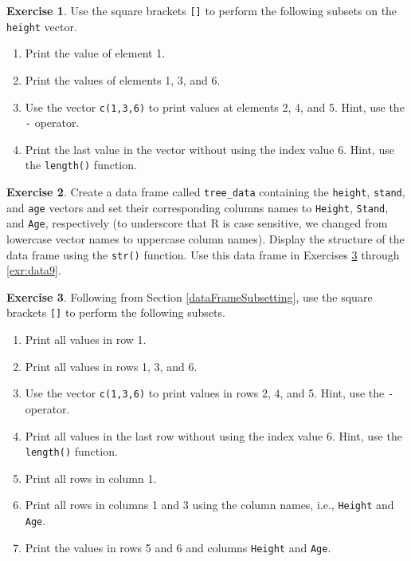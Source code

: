 \documentclass[
  11pt,
]{krantz}
\providecommand{\tightlist}{%
  \setlength{\itemsep}{0pt}\setlength{\parskip}{0pt}}
\theoremstyle{definition}
\theoremstyle{definition}
\theoremstyle{definition}
\newtheorem{exercise}{Exercise}[chapter]
\theoremstyle{definition}
\theoremstyle{remark}
\begin{document}
\begin{exercise}
\protect\hypertarget{exr:data3}{}\label{exr:data3}Use the square brackets \texttt{{[}{]}} to perform the following subsets on the \texttt{height} vector.
\end{exercise}

\begin{enumerate}
\def\labelenumi{\alph{enumi}.}
\tightlist
\item
  Print the value of element 1.
\item
  Print the values of elements 1, 3, and 6.
\item
  Use the vector \texttt{c(1,3,6)} to print values at elements 2, 4, and 5. Hint, use the \texttt{-} operator.
\item
  Print the last value in the vector without using the index value 6. Hint, use the \texttt{length()} function.
\end{enumerate}

\begin{exercise}
\protect\hypertarget{exr:data4}{}\label{exr:data4}Create a data frame called \texttt{tree\_data} containing the \texttt{height}, \texttt{stand}, and \texttt{age} vectors and set their corresponding columns names to \texttt{Height}, \texttt{Stand}, and \texttt{Age}, respectively (to underscore that R is case sensitive, we changed from lowercase vector names to uppercase column names). Display the structure of the data frame using the \texttt{str()} function. Use this data frame in Exercises \ref{exr:data5} through \ref{exr:data9}.
\end{exercise}

\begin{exercise}
\protect\hypertarget{exr:data5}{}\label{exr:data5}Following from Section \ref{dataFrameSubsetting}, use the square brackets \texttt{{[}{]}} to perform the following subsets.
\end{exercise}

\begin{enumerate}
\def\labelenumi{\alph{enumi}.}
\tightlist
\item
  Print all values in row 1.
\item
  Print all values in rows 1, 3, and 6.
\item
  Use the vector \texttt{c(1,3,6)} to print values in rows 2, 4, and 5. Hint, use the \texttt{-} operator.
\item
  Print all values in the last row without using the index value 6. Hint, use the \texttt{length()} function.
\item
  Print all rows in column 1.
\item
  Print all rows in columns 1 and 3 using the column names, i.e., \texttt{Height} and \texttt{Age}.
\item
  Print the values in rows 5 and 6 and columns \texttt{Height} and \texttt{Age}.
\end{enumerate}
\end{document}
